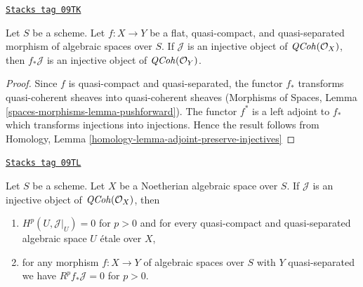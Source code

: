 \begin{lemma}
\label{spaces-perfect-lemma-flat-pullback-injective-quasi-coherent}
\href{https://stacks.math.columbia.edu/tag/09TK}{\texttt{Stacks tag 09TK}}

Let $S$ be a scheme. Let $f : X \to Y$ be a flat, quasi-compact, and
quasi-separated morphism of algebraic spaces over $S$. If
$\mathcal{J}$ is an injective object of $\mathit{QCoh}(\mathcal{O}_X)$,
then $f_*\mathcal{J}$ is an injective object of
$\mathit{QCoh}(\mathcal{O}_Y)$.
\end{lemma}

\begin{proof}
Since $f$ is quasi-compact and quasi-separated, the functor
$f_*$ transforms quasi-coherent sheaves into quasi-coherent sheaves
(Morphisms of Spaces, Lemma \ref{spaces-morphisms-lemma-pushforward}).
The functor $f^*$ is a left adjoint to $f_*$ which
transforms injections into injections.
Hence the result follows from
Homology, Lemma \ref{homology-lemma-adjoint-preserve-injectives}
\end{proof}

\begin{lemma}
\label{spaces-perfect-lemma-injective-pushforward}
\href{https://stacks.math.columbia.edu/tag/09TL}{\texttt{Stacks tag 09TL}}

Let $S$ be a scheme. Let $X$ be a Noetherian algebraic space over $S$. If
$\mathcal{J}$ is an injective object of $\mathit{QCoh}(\mathcal{O}_X)$,
then
\begin{enumerate}
\item $H^p(U, \mathcal{J}|_U) = 0$ for $p > 0$ and for
every quasi-compact and quasi-separated algebraic space $U$ \'etale over $X$,
\item for any morphism $f : X \to Y$ of algebraic spaces over $S$
with $Y$ quasi-separated we have $R^pf_*\mathcal{J} = 0$ for $p > 0$.
\end{enumerate}
\end{lemma}

